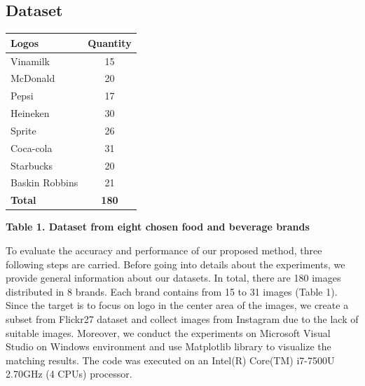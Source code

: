 \documentclass[letterpaper, 10 pt, conference]{ieeeconf}  %
\begin{document}
\subsection{Dataset}
\par
\begin{center}
\begin{tabular}{|l|c|}
\hline
Logos & Quantity\\ \hline
Vinamilk & 15\\ \hline
McDonald & 20\\ \hline
Pepsi & 17\\ \hline
Heineken & 30\\ \hline
Sprite & 26\\ \hline
Coca-cola & 31\\ \hline
Starbucks & 20\\ \hline
Baskin Robbins & 21 \\ \hline
\textbf{Total} & \textbf{180} \\ \hline
\end{tabular}
\end{center}
\begin{center}
\textbf{Table 1. Dataset from eight chosen food and beverage brands}
\end{center}
\par
To evaluate the accuracy and performance of our proposed method, three following steps are carried. Before going into details about the experiments, we provide general information about our datasets. In total, there are 180 images distributed in 8 brands. Each brand contains from 15 to 31 images (Table 1). Since the target is to focus on logo in the center area of the images, we create a subset from Flickr27 dataset and collect images from Instagram due to the lack of suitable images. Moreover, we conduct the experiments on Microsoft Visual Studio on Windows environment and use Matplotlib library to visualize the matching results. The code was executed on an Intel(R) Core(TM) i7-7500U 2.70GHz (4 CPUs) processor.\par
\end{document}
